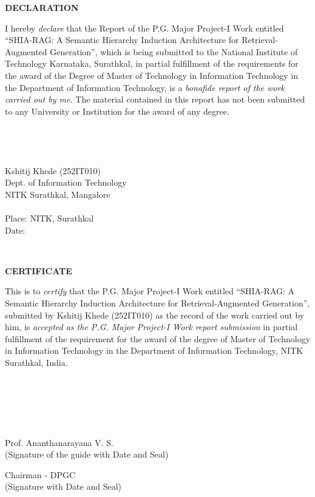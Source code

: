 \documentclass[12pt, a4paper, openright, twoside]{report}
\begin{document}
\begin{framed}
\begin{center}
\textbf{{\Large DECLARATION}}\\
\end{center}
\null
I hereby \textit{declare} that the Report of the P.G. Major Project-I Work entitled ``SHIA-RAG: A Semantic Hierarchy Induction Architecture for Retrieval-Augmented Generation'', which is being submitted to the National Institute of Technology Karnataka, Surathkal, in partial fulfillment of the requirements for the award of the Degree of Master of Technology in Information Technology in the Department of Information Technology, is a \textit{bonafide report of the work carried out by me.} The material contained in this report has not been submitted to any University or Institution for the award of any degree.\\
\\
\\
\\
\\
\null \hfill Kshitij Khede (252IT010)\\
\null \hfill Dept. of Information Technology\\
\null \hfill NITK Surathkal, Mangalore\\
\\
Place: NITK, Surathkal
\\
Date:
\end{framed}
\clearpage
\newpage
\ %
\newpage

\begin{framed}
\begin{center}
\textbf{{\Large CERTIFICATE}} \\
\end{center}
\null
This is to \textit{certify} that the P.G. Major Project-I Work entitled ``SHIA-RAG: A Semantic Hierarchy Induction Architecture for Retrieval-Augmented Generation'', submitted by Kshitij Khede (252IT010) as the record of the work carried out by him, is \textit{accepted as the P.G. Major Project-I Work report submission} in partial fulfillment of the requirement for the award of the degree of Master of Technology in Information Technology in the Department of Information Technology, NITK Surathkal, India.
\\
\\
\\
\\
\\
\\
\begin{center}
    Prof. Ananthanarayana V. S.\\
    (Signature of the guide with Date and Seal)\\
\null
\null
\null
\null
\null

    Chairman - DPGC\\
    (Signature with Date and Seal)
\end{center}
\end{framed}
\thispagestyle{empty}
\clearpage
\newpage
\ %
\newpage
\thispagestyle{empty}
\end{document}
